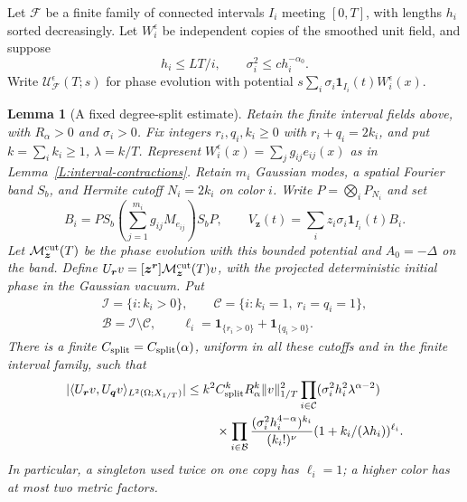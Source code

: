 \documentclass[12pt,oneside,openany]{book}
\makeatletter
\let\lean@pending\@empty
\newcommand{\LeanMarker}[1]{\gdef\lean@pending{#1}}
\numberwithin{equation}{section}
\newtheorem{lemma}[theorem]{Lemma}
\theoremstyle{nogostyle}
\theoremstyle{definition}
\makeatother
\begin{document}
Let $\mathcal{F}$ be a finite family of connected intervals $I_i$ meeting
$[0,T]$, with lengths $h_i$ sorted decreasingly. Let $W_i^\epsilon$ be
independent copies of the smoothed unit field, and suppose
\begin{equation}\label{E:interval-inventory}
  h_i\le L T/i,\qquad \sigma_i^2\le c h_i^{-\alpha_0}.
\end{equation}
Write $\mathcal{U}_{\mathcal{F}}^\epsilon(T;s)$ for phase evolution with
potential $s\sum_i\sigma_i\mathbf1_{I_i}(t)W_i^\epsilon(x)$.



\LeanMarker{L:fixed-split}
\begin{lemma}[A fixed degree-split estimate]\label{L:fixed-split}
  Retain the finite interval fields above, with $R_\alpha > 0$ and $\sigma_i >
  0$. Fix integers $r_i,q_i,k_i \ge 0$ with $r_i+q_i = 2k_i$, and put $k =
  \sum_i k_i \ge 1$, $\lambda = k/T$. Represent $W_i^\epsilon(x) =
  \sum_jg_{ij}e_{ij}(x)$ as in Lemma~\ref{L:interval-contractions}. Retain $m_i$
  Gaussian modes, a spatial Fourier band $S_b$, and Hermite cutoff $N_i = 2k_i$
  on color $i$. Write $P = \bigotimes_iP_{N_i}$ and set
  \[
    B_i=P S_b\left(\sum_{j=1}^{m_i}g_{ij}M_{e_{ij}}\right)S_bP,
    \qquad V_{\boldsymbol z}(t)
    =\sum_i z_i\sigma_i\mathbf1_{I_i}(t)B_i.
  \]
  Let $\mathcal{M}^{\rm cut}_{\boldsymbol z}(T)$ be the phase evolution with
  this bounded potential and $A_0 = -\Delta$ on the band. Define $U_{\boldsymbol
  r}v = [\boldsymbol z^{\boldsymbol r}] \mathcal{M}^{\rm cut}_{\boldsymbol
  z}(T)v$, with the projected deterministic initial phase in the Gaussian
  vacuum. Put
  \[
    \begin{gathered}
      \mathcal{I}=\{i:k_i>0\},\qquad
      \mathcal{C}=\{i:k_i=1,\ r_i=q_i=1\},\\
      \mathcal{B}=\mathcal{I}\setminus\mathcal{C},\qquad
      \ell_i=\mathbf1_{\{r_i>0\}}+\mathbf1_{\{q_i>0\}}.
    \end{gathered}
  \]
  There is a finite $C_{\rm split} = C_{\rm split}(\alpha)$, uniform in all
  these cutoffs and in the finite interval family, such that
  \begin{equation}\label{E:fixed-split-bound}
    \begin{split}
      |\langle U_{\boldsymbol r}v,U_{\boldsymbol q}v
      \rangle_{L^2(\Omega;X_{1/T})}|
      \le{}&k^2 C_{\rm split}^k R_\alpha^k\|v\|_{1/T}^2
      \prod_{i\in\mathcal{C}}
      (\sigma_i^2h_i^2\lambda^{\alpha-2})\\
      &\quad\times\prod_{i\in\mathcal{B}}
      \frac{(\sigma_i^2h_i^{4-\alpha})^{k_i}}{(k_i!)^\nu}
      (1+k_i/(\lambda h_i))^{\ell_i}.
    \end{split}
  \end{equation}
  In particular, a singleton used twice on one copy has $\ell_i = 1$; a higher
  color has at most two metric factors.
\end{lemma}
\end{document}
